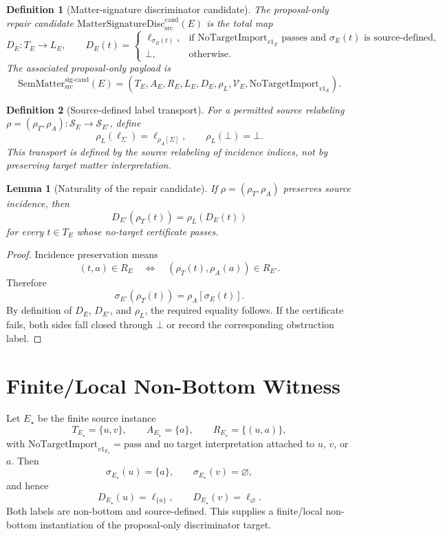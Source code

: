 \documentclass[11pt]{article}
\newcommand{\SemMatterSig}{\mathrm{SemMatter}_{\mathrm{src}}^{\mathrm{sig\text{-}cand}}}
\newcommand{\MatSigDisc}{\mathrm{MatterSignatureDisc}_{\mathrm{src}}^{\mathrm{cand}}}
\newcommand{\Bottom}{\bot}
\newcommand{\NoTarget}{\mathrm{NoTargetImport}_{v1}}
\newtheorem{definition}{Definition}
\newtheorem{lemma}{Lemma}
\begin{document}
\begin{definition}[Matter-signature discriminator candidate]
The proposal-only repair candidate \(\MatSigDisc(E)\) is the total map
\[
  D_E:T_E\to L_E,\qquad D_E(t)=
  \begin{cases}
    \ell_{\sigma_E(t)}, & \text{if } \NoTarget_E \text{ passes and }
      \sigma_E(t) \text{ is source-defined},\\
    \Bottom, & \text{otherwise.}
  \end{cases}
\]
The associated proposal-only payload is
\[
  \SemMatterSig(E)=(T_E,A_E,R_E,L_E,D_E,\rho_L,\mathcal{V}_E,\NoTarget_E).
\]
\end{definition}

\begin{definition}[Source-defined label transport]
For a permitted source relabeling
\(\rho=(\rho_T,\rho_A):\mathcal{S}_E\to\mathcal{S}_{E'}\), define
\[
  \rho_L(\ell_{\Sigma})=\ell_{\rho_A[\Sigma]},
  \qquad
  \rho_L(\Bottom)=\Bottom.
\]
This transport is defined by the source relabeling of incidence indices, not
by preserving target matter interpretation.
\end{definition}

\begin{lemma}[Naturality of the repair candidate]
If \(\rho=(\rho_T,\rho_A)\) preserves source incidence, then
\[
  D_{E'}(\rho_T(t))=\rho_L(D_E(t))
\]
for every \(t\in T_E\) whose no-target certificate passes.
\end{lemma}

\begin{proof}
Incidence preservation means
\[
  (t,a)\in R_E \quad\Longleftrightarrow\quad
  (\rho_T(t),\rho_A(a))\in R_{E'} .
\]
Therefore
\[
  \sigma_{E'}(\rho_T(t))=\rho_A[\sigma_E(t)].
\]
By definition of \(D_E\), \(D_{E'}\), and \(\rho_L\), the required equality
follows. If the certificate fails, both sides fall closed through
\(\Bottom\) or record the corresponding obstruction label.
\end{proof}

\section{Finite/Local Non-Bottom Witness}

Let \(E_\star\) be the finite source instance
\[
  T_{E_\star}=\{u,v\},\qquad
  A_{E_\star}=\{a\},\qquad
  R_{E_\star}=\{(u,a)\},
\]
with \(\NoTarget_{E_\star}=\mathrm{pass}\) and no target interpretation
attached to \(u\), \(v\), or \(a\). Then
\[
  \sigma_{E_\star}(u)=\{a\},\qquad
  \sigma_{E_\star}(v)=\varnothing,
\]
and hence
\[
  D_{E_\star}(u)=\ell_{\{a\}},\qquad
  D_{E_\star}(v)=\ell_{\varnothing}.
\]
Both labels are non-bottom and source-defined. This supplies a finite/local
non-bottom instantiation of the proposal-only discriminator target.
\end{document}
